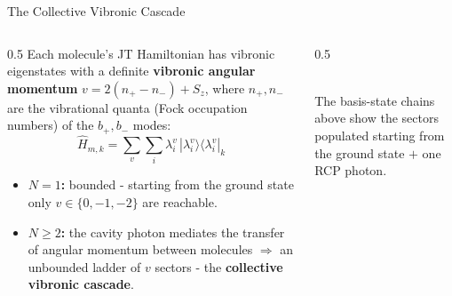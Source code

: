 \documentclass[aspectratio=169,11pt]{beamer}
\newcommand{\figcap}[1]{{\scriptsize\color{capgray}#1}}
\begin{document}
\begin{frame}{The Collective Vibronic Cascade}
  \begin{columns}[T]
    \begin{column}{0.5\textwidth}
      \small
      Each molecule's JT Hamiltonian has vibronic eigenstates with a definite
      \textbf{vibronic angular momentum} $v=2(n_+-n_-)+S_z$, where $n_+,n_-$
      are the vibrational quanta (Fock occupation numbers) of the $b_+,b_-$
      modes:
      \[\hat H_{m,k}=\sum_v\sum_i \lambda_i^{v}\,|\lambda_i^{v}\rangle\langle\lambda_i^{v}|_k\]
      \begin{itemize}
        \item \textbf{$N=1$:} bounded - starting from the ground state only
              $v\in\{0,-1,-2\}$ are reachable.
        \item \textbf{$N\ge 2$:} the cavity photon mediates the transfer of angular momentum between molecules
             $\Rightarrow$ an unbounded ladder of $v$
              sectors - the \textbf{collective vibronic cascade}.
      \end{itemize}
    \end{column}
    \begin{column}{0.5\textwidth}
      \centering
      \\[0.4em]
      \figcap{The basis-state chains above show the sectors populated
      starting from the ground state $+$ one RCP photon.}
    \end{column}
  \end{columns}
\end{frame}
\end{document}
